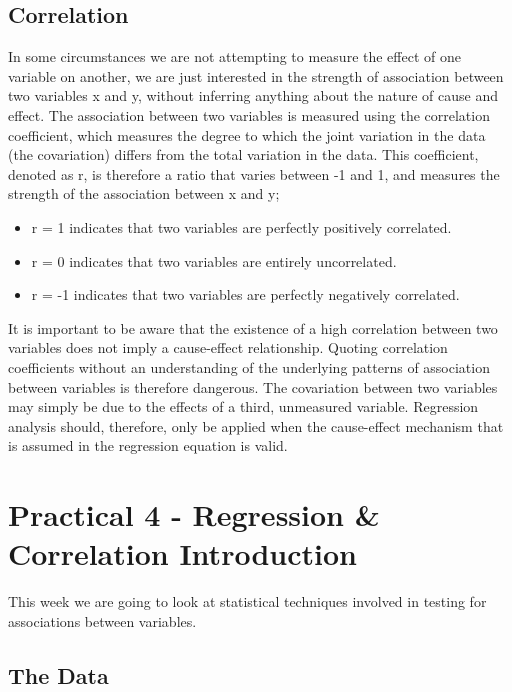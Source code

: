 \documentclass[
]{book}
\providecommand{\tightlist}{%
  \setlength{\itemsep}{0pt}\setlength{\parskip}{0pt}}
\begin{document}
\hypertarget{correlation}{%
\subsection*{Correlation}\label{correlation}}

In some circumstances we are not attempting to measure the effect of one variable on another, we are just interested in the strength of association between two variables x and y, without inferring anything about the nature of cause and effect. The association between two variables is measured using the correlation coefficient, which measures the degree to which the joint variation in the data (the covariation) differs from the total variation in the data. This coefficient, denoted as r, is therefore a ratio that varies between -1 and 1, and measures the strength of the association between x and y;

\begin{itemize}
\tightlist
\item
  r = 1 indicates that two variables are perfectly positively correlated.
\item
  r = 0 indicates that two variables are entirely uncorrelated.
\item
  r = -1 indicates that two variables are perfectly negatively correlated.
\end{itemize}

It is important to be aware that the existence of a high correlation between two variables does not imply a cause-effect relationship. Quoting correlation coefficients without an understanding of the underlying patterns of association between variables is therefore dangerous. The covariation between two variables may simply be due to the effects of a third, unmeasured variable. Regression analysis should, therefore, only be applied when the cause-effect mechanism that is assumed in the regression equation is valid.

\hypertarget{practical-4---regression-correlation-introduction}{%
\section{Practical 4 - Regression \& Correlation Introduction}\label{practical-4---regression-correlation-introduction}}

This week we are going to look at statistical techniques involved in testing for associations between variables.

\hypertarget{the-data-2}{%
\subsection{The Data}\label{the-data-2}}
\end{document}
